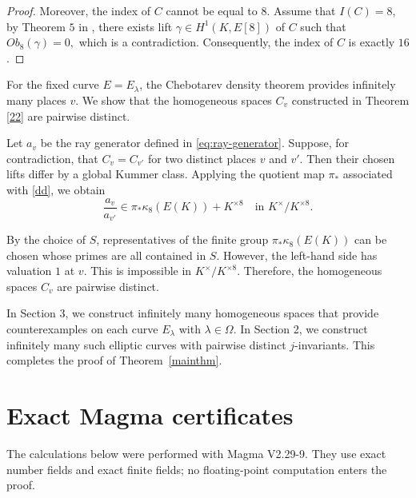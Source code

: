 \documentclass[11pt,a4paper]{amsart}
\theoremstyle{definition}
\numberwithin{equation}{section}
\begin{document}
\begin{proof}
 Moreover, the index of $C$ cannot be equal to $8$. Assume that $I(C)=8$, by Theorem $5$ in \cite{clark},  there exists
 lift $\gamma\in H^1(K,E[8])$ of $C$ such that
$
 Ob_8(\gamma)=0,
$ which is a contradiction.
 Consequently, the index of $C$ is exactly $16$.
\end{proof}



For the fixed curve $E=E_\lambda$, the Chebotarev density theorem
provides infinitely many  places $v$. We show that
the homogeneous spaces $C_{v}$ constructed in Theorem \ref{22} are
pairwise distinct.

Let $a_{v}$ be the ray generator defined in
\eqref{eq:ray-generator}. Suppose, for contradiction, that
$
C_{v}=C_{v'}
$
for two distinct places $v$ and $v'$. Then their
chosen lifts differ by a global Kummer class. Applying the quotient map
$\pi_*$ associated with \eqref{dd}, we obtain
\[
\frac{a_{v}}{a_{v'}}
\in
\pi_*\kappa_8(E(K))+K^{\times 8}
\quad\text{in }K^\times/K^{\times8}.
\]

By the choice of $S$, representatives of the finite group
$\pi_*\kappa_8(E(K))$ can be chosen whose primes are all contained
in $S$. However, the left-hand side has valuation \(1\) at
$v$. This is impossible in
$K^\times/K^{\times8}$. Therefore, the homogeneous spaces
$C_{v}$ are pairwise distinct.

In Section 3, we construct infinitely many homogeneous spaces that provide counterexamples on each curve \(E_\lambda\) with \(\lambda\in\Omega\). In Section 2, we construct infinitely many such elliptic curves with pairwise distinct \(j\)-invariants. This completes the proof of Theorem~\ref{mainthm}.



\appendix
\makeatletter
\renewcommand{\subsection}{%
	\@startsection{subsection}{2}%
	{\z@}%
	{.5\linespacing\@plus.7\linespacing}%
	{.5\linespacing}%
	{\normalfont\bfseries}%
}
\makeatother

\section{Exact Magma certificates}

The calculations below were performed with Magma V2.29-9.  They use exact
number fields and exact finite fields; no floating-point computation enters the proof.
\end{document}

